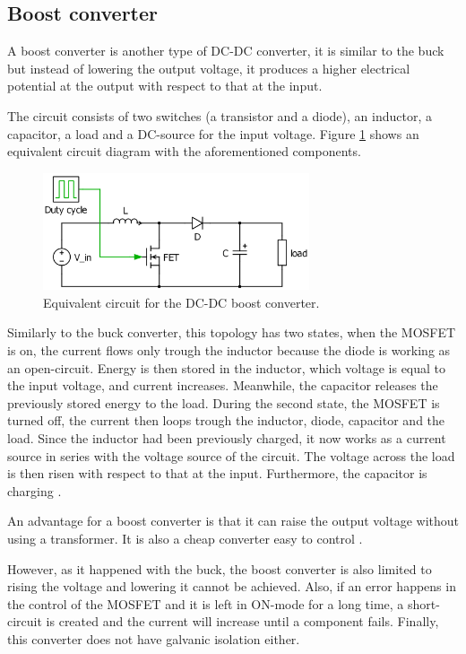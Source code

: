 \subsection{Boost converter\label{Boost-C}}

A boost converter is another type of DC-DC converter, it is similar to the buck but instead of lowering the output voltage, it produces a higher electrical potential at the output with respect to that at the input.

The circuit consists of two switches (a transistor and a diode), an inductor, a capacitor, a load and a DC-source for the input voltage. Figure \ref{Boost-converter} shows an equivalent circuit diagram with the aforementioned components. %

\begin{figure}[htbp]
	\begin{center}
		\includegraphics[width=0.7\textwidth]{../Pictures/Boost-converter}
		\caption{Equivalent circuit for the DC-DC boost converter.}
		\label{Boost-converter}
	\end{center}	
\end{figure}

Similarly to the buck converter, this topology has two states, when the MOSFET is on, the current flows only trough the inductor because the diode  is working as an open-circuit. Energy is then stored in the inductor, which voltage is equal to the input voltage, and current increases. Meanwhile, the capacitor releases the previously stored energy to the load.
During the second state, the MOSFET is turned off, the current then loops trough the inductor, diode, capacitor and the load. Since the inductor had been previously charged, it now works as a current source in series with the voltage source of the circuit. The voltage across the load is then risen with respect to that at the input. Furthermore, the capacitor is charging \cite{schematicbuckandboost}.

An advantage for a boost converter is that it can raise the output voltage without using a transformer. It is also a cheap converter easy to control \cite{advantagebuckboost}. 

However, as it happened with the buck, the boost converter is also limited to rising the voltage and lowering it cannot be achieved. Also, if an error happens in the control of the MOSFET and it is left in ON-mode for a long time, a short-circuit is created and the current will increase until a component fails. Finally, this converter does not have galvanic isolation either. 
 
